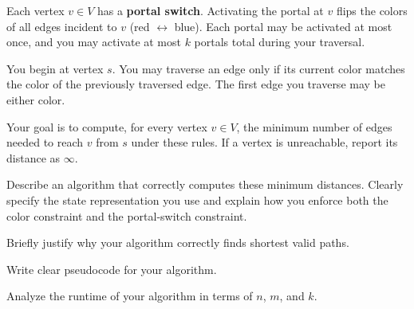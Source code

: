 \documentclass[11  pt]{article}
\begin{document}
Each vertex $v \in V$ has a \textbf{portal switch}. Activating the portal at $v$ flips the colors of all edges incident to $v$ (red $\leftrightarrow$ blue).  
Each portal may be activated at most once, and you may activate at most $k$ portals total during your traversal.

You begin at vertex $s$.  
You may traverse an edge only if its current color matches the color of the previously traversed edge.  
The first edge you traverse may be either color.

Your goal is to compute, for every vertex $v \in V$, the minimum number of edges needed to reach $v$ from $s$ under these rules.  
If a vertex is unreachable, report its distance as $\infty$.

\babc
\item 
Describe an algorithm that correctly computes these minimum distances.  
Clearly specify the state representation you use and explain how you enforce both the color constraint and the portal-switch constraint.

\item 
Briefly justify why your algorithm correctly finds shortest valid paths.

\item 
Write clear pseudocode for your algorithm.

\item 
Analyze the runtime of your algorithm in terms of $n$, $m$, and $k$.
\eabc
\end{document}
